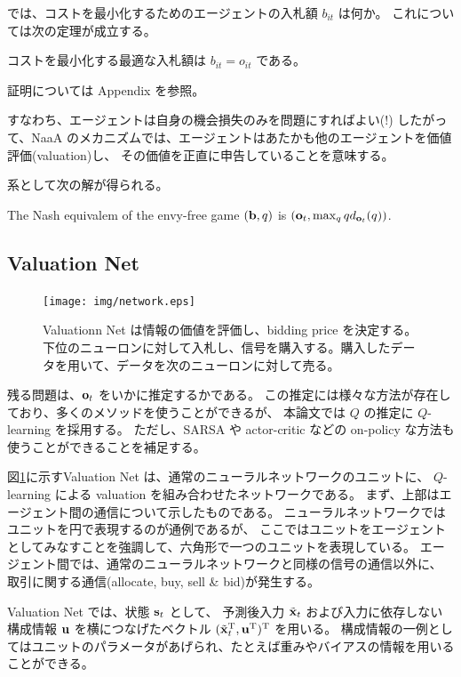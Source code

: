では、コストを最小化するためのエージェントの入札額 $b_{it}$ は何か。
これについては次の定理が成立する。

\begin{thm}\label{thm:optimal-bidding}
コストを最小化する最適な入札額は $b_{it} = o_{it}$ である。
\end{thm}
証明については Appendix を参照。

すなわち、エージェントは自身の機会損失のみを問題にすればよい(!)
したがって、NaaA のメカニズムでは、エージェントはあたかも他のエージェントを価値評価(valuation)し、
その価値を正直に申告していることを意味する。

系として次の解が得られる。
\begin{coro}\label{coro:optimal-bidding}
The Nash equivalem of the envy-free game $(\mathrm{\mathbf{b}}, q)$ is $(\mathrm{\mathbf{o}}_t, \max_{q} q d_{\mathrm{\mathbf{o}}_t}(q))$.
\end{coro}



\subsection{Valuation Net}

\begin{figure}[t]
\centering
\texttt{[image: img/network.eps]}
\caption{
Valuationn Net は情報の価値を評価し、bidding price を決定する。
下位のニューロンに対して入札し、信号を購入する。購入したデータを用いて、データを次のニューロンに対して売る。
}
\label{fig:network}
\end{figure}

残る問題は、$\mathrm{\mathbf{o}}_t$ をいかに推定するかである。
この推定には様々な方法が存在しており、多くのメソッドを使うことができるが、
本論文では $Q$ の推定に $Q$-learning を採用する。
ただし、SARSA や actor-critic などの on-policy な方法も使うことができることを補足する。

図\ref{fig:network}に示すValuation Net は、通常のニューラルネットワークのユニットに、
$Q$-learning による valuation を組み合わせたネットワークである。
まず、上部はエージェント間の通信について示したものである。
ニューラルネットワークではユニットを円で表現するのが通例であるが、
ここではユニットをエージェントとしてみなすことを強調して、六角形で一つのユニットを表現している。
エージェント間では、通常のニューラルネットワークと同様の信号の通信以外に、
取引に関する通信(allocate, buy, sell \& bid)が発生する。

Valuation Net では、状態 $\mathrm{\mathbf{s}}_t$ として、
予測後入力 $\tilde{\mathrm{\mathbf{x}}}_t$ および入力に依存しない構成情報 $\mathrm{\mathbf{u}}$ を横につなげたベクトル $(\tilde{\mathrm{\mathbf{x}}}_t^{\mathrm{T}}, \mathrm{\mathbf{u}}^{\mathrm{T}})^{\mathrm{T}}$ を用いる。
構成情報の一例としてはユニットのパラメータがあげられ、たとえば重みやバイアスの情報を用いることができる。

